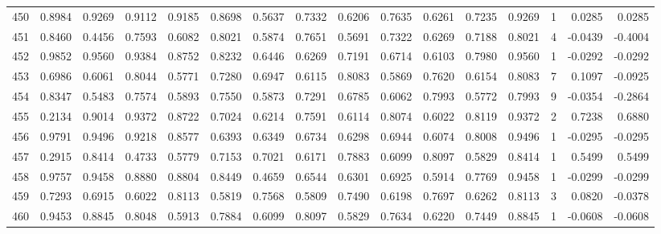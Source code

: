 \begin{tabular}{lrrrrrrrrrrrrrrr}
450 &      0.8984 &  0.9269 &  0.9112 &  0.9185 &  0.8698 &  0.5637 &  0.7332 &  0.6206 &  0.7635 &  0.6261 &   0.7235 &     0.9269 &      1 &                    0.0285 &                     0.0285 \\
451 &      0.8460 &  0.4456 &  0.7593 &  0.6082 &  0.8021 &  0.5874 &  0.7651 &  0.5691 &  0.7322 &  0.6269 &   0.7188 &     0.8021 &      4 &                   -0.0439 &                    -0.4004 \\
452 &      0.9852 &  0.9560 &  0.9384 &  0.8752 &  0.8232 &  0.6446 &  0.6269 &  0.7191 &  0.6714 &  0.6103 &   0.7980 &     0.9560 &      1 &                   -0.0292 &                    -0.0292 \\
453 &      0.6986 &  0.6061 &  0.8044 &  0.5771 &  0.7280 &  0.6947 &  0.6115 &  0.8083 &  0.5869 &  0.7620 &   0.6154 &     0.8083 &      7 &                    0.1097 &                    -0.0925 \\
454 &      0.8347 &  0.5483 &  0.7574 &  0.5893 &  0.7550 &  0.5873 &  0.7291 &  0.6785 &  0.6062 &  0.7993 &   0.5772 &     0.7993 &      9 &                   -0.0354 &                    -0.2864 \\
455 &      0.2134 &  0.9014 &  0.9372 &  0.8722 &  0.7024 &  0.6214 &  0.7591 &  0.6114 &  0.8074 &  0.6022 &   0.8119 &     0.9372 &      2 &                    0.7238 &                     0.6880 \\
456 &      0.9791 &  0.9496 &  0.9218 &  0.8577 &  0.6393 &  0.6349 &  0.6734 &  0.6298 &  0.6944 &  0.6074 &   0.8008 &     0.9496 &      1 &                   -0.0295 &                    -0.0295 \\
457 &      0.2915 &  0.8414 &  0.4733 &  0.5779 &  0.7153 &  0.7021 &  0.6171 &  0.7883 &  0.6099 &  0.8097 &   0.5829 &     0.8414 &      1 &                    0.5499 &                     0.5499 \\
458 &      0.9757 &  0.9458 &  0.8880 &  0.8804 &  0.8449 &  0.4659 &  0.6544 &  0.6301 &  0.6925 &  0.5914 &   0.7769 &     0.9458 &      1 &                   -0.0299 &                    -0.0299 \\
459 &      0.7293 &  0.6915 &  0.6022 &  0.8113 &  0.5819 &  0.7568 &  0.5809 &  0.7490 &  0.6198 &  0.7697 &   0.6262 &     0.8113 &      3 &                    0.0820 &                    -0.0378 \\
460 &      0.9453 &  0.8845 &  0.8048 &  0.5913 &  0.7884 &  0.6099 &  0.8097 &  0.5829 &  0.7634 &  0.6220 &   0.7449 &     0.8845 &      1 &                   -0.0608 &                    -0.0608 \\

\end{tabular}
